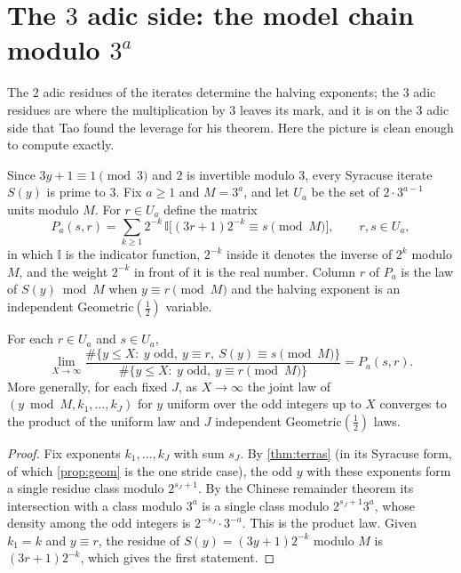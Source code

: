 \section{The $3$ adic side: the model chain modulo $3^a$}\label{sec:ch9:spectral}

The $2$ adic residues of the iterates determine the halving exponents; the
$3$ adic residues are where the multiplication by $3$ leaves its mark, and it
is on the $3$ adic side that Tao found the leverage for his theorem. Here the
picture is clean enough to compute exactly.

Since $3y+1\equiv1\pmod3$ and $2$ is invertible modulo $3$, every Syracuse
iterate $S(y)$ is prime to $3$. Fix $a\geq1$ and $M=3^a$, and let $U_a$ be the
set of $2\cdot3^{a-1}$ units modulo $M$. For $r\in U_a$ define the matrix
\begin{equation}\label{eq:ch9:P}
  P_a(s,r)=\sum_{k\geq1}2^{-k}\,\mathbb{I}\bigl[(3r+1)2^{-k}\equiv s\pmod M\bigr],
  \qquad r,s\in U_a ,
\end{equation}
in which $\mathbb{I}$ is the indicator function, $2^{-k}$ inside it denotes the inverse of $2^k$ modulo $M$, and the weight $2^{-k}$ in front of it is the real number. Column $r$ of $P_a$
is the law of $S(y)\bmod M$ when $y\equiv r\pmod M$ and the halving exponent is
an independent Geometric$(\tfrac12)$ variable.

\begin{lemma}\label{lem:ch9:exact}
For each $r\in U_a$ and $s\in U_a$,
\[
  \lim_{X\to\infty}\frac{\#\{y\le X:\ y\text{ odd},\ y\equiv r,\ S(y)\equiv s\pmod M\}}
  {\#\{y\le X:\ y\text{ odd},\ y\equiv r\pmod M\}}=P_a(s,r).
\]
More generally, for each fixed $J$, as $X\to\infty$ the joint law of
$(y\bmod M,k_1,\ldots,k_J)$ for $y$ uniform over the odd integers up to $X$
converges to the product of the uniform law and $J$ independent
Geometric$(\tfrac12)$ laws.
\end{lemma}

\begin{proof}
Fix exponents $k_1,\ldots,k_J$ with sum $s_J$. By \cref{thm:terras} (in its
Syracuse form, of which \cref{prop:geom} is the one stride case), the odd $y$ with these exponents form a
single residue class modulo $2^{s_J+1}$. By the Chinese remainder theorem its
intersection with a class modulo $3^a$ is a single class modulo
$2^{s_J+1}3^a$, whose density among the odd integers is
$2^{-s_J}\cdot3^{-a}$. This is the product law. Given $k_1=k$ and
$y\equiv r$, the residue of $S(y)=(3y+1)2^{-k}$ modulo $M$ is
$(3r+1)2^{-k}$, which gives the first statement.
\end{proof}

